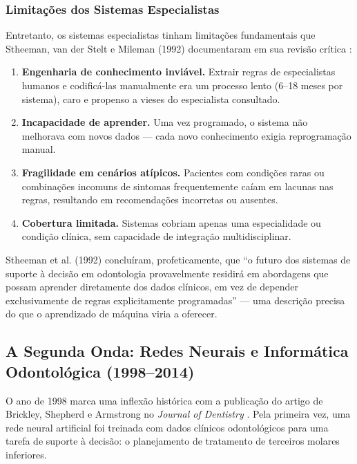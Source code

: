 \subsubsection{Limitações dos Sistemas Especialistas}

Entretanto, os sistemas especialistas tinham limitações fundamentais que Stheeman, van der Stelt e Mileman (1992) documentaram em sua revisão crítica \cite{ODT-008}:

\begin{enumerate}
    \item \textbf{Engenharia de conhecimento inviável.} Extrair regras de especialistas humanos e codificá-las manualmente era um processo lento (6--18 meses por sistema), caro e propenso a vieses do especialista consultado.
    \item \textbf{Incapacidade de aprender.} Uma vez programado, o sistema não melhorava com novos dados — cada novo conhecimento exigia reprogramação manual.
    \item \textbf{Fragilidade em cenários atípicos.} Pacientes com condições raras ou combinações incomuns de sintomas frequentemente caíam em lacunas nas regras, resultando em recomendações incorretas ou ausentes.
    \item \textbf{Cobertura limitada.} Sistemas cobriam apenas uma especialidade ou condição clínica, sem capacidade de integração multidisciplinar.
\end{enumerate}

Stheeman et al. (1992) concluíram, profeticamente, que ``o futuro dos sistemas de suporte à decisão em odontologia provavelmente residirá em abordagens que possam aprender diretamente dos dados clínicos, em vez de depender exclusivamente de regras explicitamente programadas'' — uma descrição precisa do que o aprendizado de máquina viria a oferecer.

\subsection{A Segunda Onda: Redes Neurais e Informática Odontológica (1998--2014)}

O ano de 1998 marca uma inflexão histórica com a publicação do artigo de Brickley, Shepherd e Armstrong no \textit{Journal of Dentistry} \cite{ODT-002}. Pela primeira vez, uma rede neural artificial foi treinada com dados clínicos odontológicos para uma tarefa de suporte à decisão: o planejamento de tratamento de terceiros molares inferiores.



